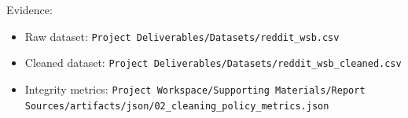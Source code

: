 Evidence:
\begin{itemize}
  \item Raw dataset: \verb|Project Deliverables/Datasets/reddit_wsb.csv|
  \item Cleaned dataset: \verb|Project Deliverables/Datasets/reddit_wsb_cleaned.csv|
  \item Integrity metrics: \verb|Project Workspace/Supporting Materials/Report Sources/artifacts/json/02_cleaning_policy_metrics.json|
\end{itemize}
